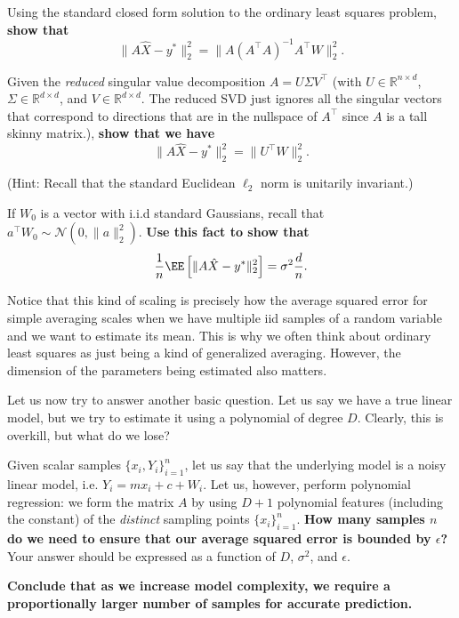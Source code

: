 \begin{Parts}
\Part Using the standard closed form solution to the ordinary least squares problem, {\bf show that}
$$\| A \hat{X} - y^* \|_2^2 = \| A (A^\top A)^{-1} A^\top W \|_2^2.$$



\Part Given the \emph{reduced} singular value decomposition $A = U
\Sigma V^\top$ (with $U \in \mathbb{R}^{n \times d}$, $\Sigma \in
\mathbb{R}^{d \times d}$, and $V \in \mathbb{R}^{d \times d}$. The
reduced SVD just ignores all the singular vectors that correspond to
directions that are in the nullspace of $A^\top$ since $A$ is a tall
skinny matrix.), {\bf show that we have}
$$\| A \hat{X} - y^* \|_2^2 = \| U^\top W \|_2^2.$$

(Hint: Recall that the standard Euclidean $\ell_2$ norm is unitarily invariant.)



\Part If $W_0$ is a vector with i.i.d standard Gaussians, recall that
$a^\top W_0 \sim \mathcal{N}(0, \|a\|_2^2)$.  {\bf Use this fact to show that}
$$\frac{1}{n} \EE \left[ \| A \hat{X} - y^* \|_2^2 \right] = \sigma^2 \frac{d}{n}.$$ 

Notice that this kind of scaling is precisely how the average squared error for simple
averaging scales when we have multiple iid samples of a random
variable and we want to estimate its mean. This is why we often think
about ordinary least squares as just being a kind of generalized
averaging. However, the dimension of the parameters being estimated
also matters.



\Part Let us now try to answer another basic question. Let us say we
have a true linear model, but we try to estimate it using a polynomial of degree $D$. Clearly, this is overkill, but what do we lose?

Given scalar samples $\{x_i, Y_i\}_{i=1}^n$, let us say that
the underlying model is a noisy linear model, i.e. $Y_i = m x_i + c +
W_i$. Let us, however, perform polynomial regression: we form the
matrix $A$ by using $D+1$ polynomial features (including the constant)
of the \emph{distinct} sampling points $\{x_i\}_{i=1}^n$. {\bf How many samples $n$ do
  we need to ensure that our average squared error is bounded by $\epsilon$?} Your answer should be expressed as a function of $D$, $\sigma^2$, and $\epsilon$.

{\bf Conclude that as we increase model complexity, we require a
  proportionally larger number of samples for accurate prediction.}


\end{Parts}
